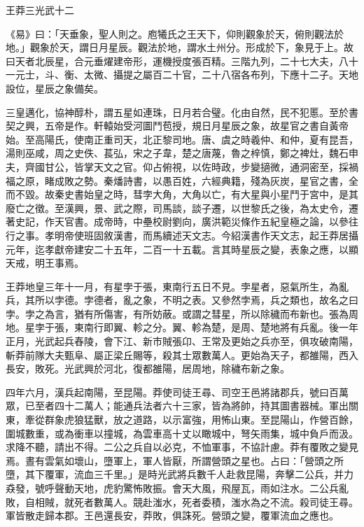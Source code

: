 
\begin{pinyinscope}
王莽三光武十二

《易》曰：「天垂象，聖人則之。庖犧氏之王天下，仰則觀象於天，俯則觀法於地。」觀象於天，謂日月星辰。觀法於地，謂水土州分。形成於下，象見于上。故曰天者北辰星，合元垂燿建帝形，運機授度張百精。三階九列，二十七大夫，八十一元士，斗、衡、太微、攝提之屬百二十官，二十八宿各布列，下應十二子。天地設位，星辰之象備矣。

三皇邁化，協神醇朴，謂五星如連珠，日月若合璧。化由自然，民不犯慝。至於書契之興，五帝是作。軒轅始受河圖鬥苞授，規日月星辰之象，故星官之書自黃帝始。至高陽氏，使南正重司天，北正黎司地。唐、虞之時羲仲、和仲，夏有昆吾，湯則巫咸，周之史佚、萇弘，宋之子韋，楚之唐蔑，魯之梓慎，鄭之裨灶，魏石申夫，齊國甘公，皆掌天文之官。仰占俯視，以佐時政，步變擿微，通洞密至，採禍福之原，睹成敗之勢。秦燔詩書，以愚百姓，六經典籍，殘為灰炭，星官之書，全而不毀。故秦史書始皇之時，彗孛大角，大角以亡，有大星與小星鬥于宮中，是其廢亡之徵。至漢興，景、武之際，司馬談，談子遷，以世黎氏之後，為太史令，遷著史記，作天官書。成帝時，中壘校尉劉向，廣洪範災條作五紀皇極之論，以參往行之事。孝明帝使班固敘漢書，而馬續述天文志。今紹漢書作天文志，起王莽居攝元年，迄孝獻帝建安二十五年，二百一十五載。言其時星辰之變，表象之應，以顯天戒，明王事焉。

王莽地皇三年十一月，有星孛于張，東南行五日不見。孛星者，惡氣所生，為亂兵，其所以孛德。孛德者，亂之象，不明之表。又參然孛焉，兵之類也，故名之曰孛。孛之為言，猶有所傷害，有所妨蔽。或謂之彗星，所以除穢而布新也。張為周地。星孛于張，東南行即翼、軫之分。翼、軫為楚，是周、楚地將有兵亂。後一年正月，光武起兵舂陵，會下江、新巿賊張卬、王常及更始之兵亦至，俱攻破南陽，斬莽前隊大夫甄阜、屬正梁丘賜等，殺其士眾數萬人。更始為天子，都雒陽，西入長安，敗死。光武興於河北，復都雒陽，居周地，除穢布新之象。

四年六月，漢兵起南陽，至昆陽。莽使司徒王尋、司空王邑將諸郡兵，號曰百萬眾，已至者四十二萬人；能通兵法者六十三家，皆為將帥，持其圖書器械。軍出關東，牽從群象虎狼猛獸，放之道路，以示富強，用怖山東。至昆陽山，作營百餘，圍城數重，或為衝車以撞城，為雲車高十丈以瞰城中，弩矢雨集，城中負戶而汲。求降不聽，請出不得。二公之兵自以必克，不恤軍事，不協計慮。莽有覆敗之變見焉。晝有雲氣如壞山，墮軍上，軍人皆厭，所謂營頭之星也。占曰：「營頭之所墮，其下覆軍，流血三千里。」是時光武將兵數千人赴救昆陽，奔擊二公兵，并力猋發，號呼聲動天地，虎豹驚怖敗振。會天大風，飛屋瓦，雨如注水。二公兵亂敗，自相賊，就死者數萬人。競赴滍水，死者委積，滍水為之不流。殺司徒王尋。軍皆散走歸本郡。王邑還長安，莽敗，俱誅死。營頭之變，覆軍流血之應也。


\end{pinyinscope}
